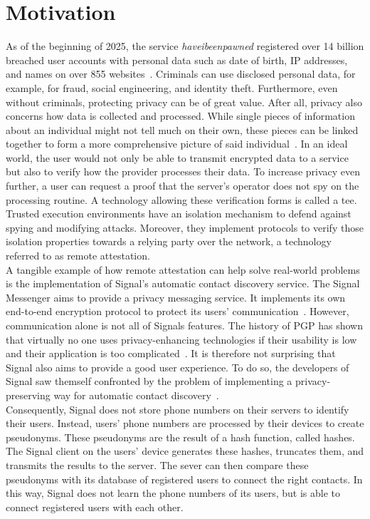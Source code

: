 \section{Motivation}
\label{sec:10:motivation}
As of the beginning of 2025, the service \textit{haveibeenpawned} registered
over 14 billion breached user accounts with personal data such as date of birth,
IP addresses, and names on over 855 websites~\cite{haveibeenpawned}. Criminals
can use disclosed personal data, for example, for fraud, social engineering, and
identity theft. Furthermore, even without criminals, protecting privacy can be
of great value. After all, privacy also concerns how data is collected and
processed. While single pieces of information about an individual might not tell
much on their own, these pieces can be linked together to form a more
comprehensive picture of said individual~\cite{solove2007ve}. In an ideal world,
the user would not only be able to transmit encrypted data to a service but also
to verify how the provider processes their data. To increase privacy even
further, a user can request a proof that the server's operator does not spy on
the processing routine. A technology allowing these verification forms is called
a \gls{tee}. Trusted execution environments have an isolation mechanism to
defend against spying and modifying attacks. Moreover, they implement protocols
to verify those isolation properties towards a relying party over the network,
a technology referred to as remote attestation. \\

A tangible example of how remote attestation can help solve real-world problems
is the implementation of Signal's automatic contact discovery service. The
Signal Messenger aims to provide a privacy messaging service. It implements its
own end-to-end encryption protocol to protect its users'
communication~\cite{cohn2020formal}. However, communication alone is not all of
Signals features. The history of PGP has shown that virtually no one uses
privacy-enhancing technologies if their usability is low and their application
is too complicated~\cite{ruoti2015johnny}. It is therefore not surprising that
Signal also aims to provide a good user experience. To do so, the developers of
Signal saw themself confronted by the problem of implementing a
privacy-preserving way for automatic contact discovery~\cite{SignalCd}.\\

Consequently, Signal does not store phone numbers on their servers to identify
their users. Instead, users' phone numbers are processed by their devices to
create pseudonyms. These pseudonyms are the result of a hash function, called
hashes. The Signal client on the users' device generates these hashes, truncates
them, and transmits the results to the server. The sever can then compare these
pseudonyms with its database of registered users to connect the right contacts.
In this way, Signal does not learn the phone numbers of its users, but is able
to connect registered users with each other.\\

